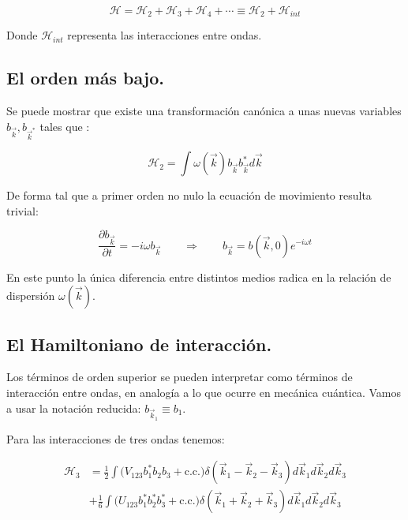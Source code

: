 \begin{equation}
	\mathcal{H} = \mathcal{H}_2 + \mathcal{H}_3 + \mathcal{H}_4 + \cdots \equiv \mathcal{H}_2 + \mathcal{H}_{int}
\end{equation}

Donde $\mathcal{H}_{int}$ representa las interacciones entre ondas. 
\subsection*{El orden más bajo.}

Se puede mostrar que existe una transformación canónica a unas nuevas variables $b_{\vec{k}},b_{\vec{k}^*}$ tales que \cite{zakharovKolmogorovSpectraTurbulence1992}:

\begin{equation}
	\mathcal{H}_2 = \int \omega(\vec k)b_{\vec k}b^*_{\vec k} d\vec k 
\end{equation} 

De forma tal que a primer orden no nulo la ecuación de movimiento resulta trivial:

\begin{equation}
	\frac{\partial b_{\vec{k}}}{\partial t}=-i\omega b_{\vec{k}} \qquad \Rightarrow{} \qquad b_{\vec{k}}=b(\vec k, 0)e^{-i\omega t}
\end{equation}

En este punto la única diferencia entre distintos medios radica en la relación de dispersión $\omega(\vec k)$.

\subsection*{El Hamiltoniano de interacción.}
Los términos de orden superior se pueden interpretar como términos de interacción entre ondas, en analogía a lo que ocurre en mecánica cuántica. Vamos a usar la notación reducida: $b_{\vec k_1} \equiv b_1$.

Para las interacciones de tres ondas tenemos:

\begin{equation}
	\begin{split}
		\mathcal{H}_3 &= \frac{1}{2}\int\big(V_{123}b^*_1b_2b_3+\text{c.c.}\big)\delta(\vec k_1-\vec k_2 -\vec k_3) d\vec k_1d\vec k_2d\vec k_3 \\ &+ \frac{1}{6} \int\big(U_{123}b^*_1b^*_2b^*_3+\text{c.c.}\big)\delta(\vec k_1 + \vec k_2 + \vec k_3) d\vec k_1d\vec k_2d\vec k_3
	\end{split}
\end{equation} 

